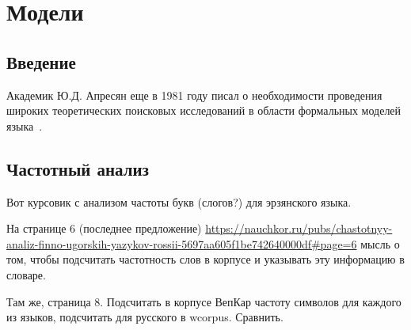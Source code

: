 \chapter{Модели} \label{chapt_models}

\section{Введение} \label{sect_model_intro}
Академик Ю.Д. Апресян еще в 1981 году писал о необходимости проведения широких теоретических поисковых исследований в области формальных моделей языка~\cite{Apresjan1981}.

\section{Частотный анализ} \label{sect_ideas_1}


Вот курсовик с анализом частоты букв (слогов?) для эрзянского языка.

На странице 6 (последнее предложение)
\url{https://nauchkor.ru/pubs/chastotnyy-analiz-finno-ugorskih-yazykov-rossii-5697aa605f1be742640000df#page=6}
мысль о том, чтобы подсчитать частотность слов в корпусе и указывать эту информацию в словаре.

Там же, страница 8. Подсчитать в корпусе ВепКар частоту символов для каждого из языков, 
подсчитать для русского в wcorpus. Сравнить.


